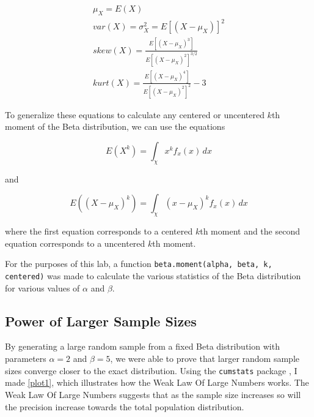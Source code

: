 \documentclass{article}\usepackage[]{graphicx}\usepackage[]{xcolor}
\begin{document}
\begin{multicols}{2}
\begin{align*}
 \mu_X = E(X) \tag{The Mean}\\
 var(X) = \sigma^2_X = E[(X-\mu_X)]^2 \tag{The Variance}\\
 skew(X) = \frac{E[(X - \mu_X)^3]}{E[(X-\mu_X)^2]^{3/2}} \tag{The Skewness}\\
 kurt(X) = \frac{E[(X-\mu_X)^4]}{E[(X-\mu_X)^2]^2} - 3 \tag{The Excess Kurtsosis}
\end{align*}

To generalize these equations to calculate any centered or uncentered $k$th moment of the Beta distribution, we can use the equations

\[E(X^{k}) = \int_{\chi}^{} x^{k}f_x(x) \,dx \]
\begin{center}
and 
\end{center}
\[E((X-\mu_X)^{k}) = \int_{\chi}^{} (x-\mu_X)^{k}f_x(x) \,dx \]

where the first equation corresponds to a centered $k$th moment and the second equation corresponds to a uncentered $k$th moment.

For the purposes of this lab, a function \verb|beta.moment(alpha, beta, k, centered)| was made to calculate the various statistics of the Beta distribution for various values of $\alpha$ and $\beta$.

\subsection{Power of Larger Sample Sizes}
By generating a large random sample from a fixed Beta distribution with parameters $\alpha = 2$ and $\beta = 5$, we were able to prove that larger random sample sizes converge closer to the exact distribution. Using the \texttt{cumstats} package \citep{cumstats}, I made \autoref{plot1}, which illustrates how the Weak Law Of Large Numbers works. The Weak Law Of Large Numbers suggests that as the sample size increases so will the precision increase towards the total population distribution.


\end{multicols}
\end{document}
